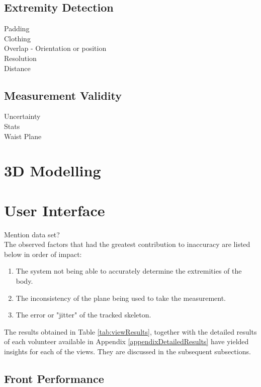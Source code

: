 \subsection{Extremity Detection}
Padding\\
Clothing\\
Overlap - Orientation or position\\
Resolution\\
Distance\\

\subsection{Measurement Validity}
Uncertainty\\
Stats\\
Waist Plane\\

\section{3D Modelling}

\section{User Interface}

\iffalse

Mention data set?\\

The observed factors that had the greatest contribution to inaccuracy are listed below in order of impact:

\begin{enumerate}
	\item The system not being able to accurately determine the extremities of the body.
	\item The inconsistency of the plane being used to take the measurement.
	\item The error or "jitter" of the tracked skeleton.
\end{enumerate}



The results obtained in Table \ref{tab:viewResults}, together with the detailed results of each volunteer available in Appendix \ref{appendixDetailedResults} have yielded insights for each of the views. They are discussed in the subsequent subsections. 

\subsection{Front Performance}

